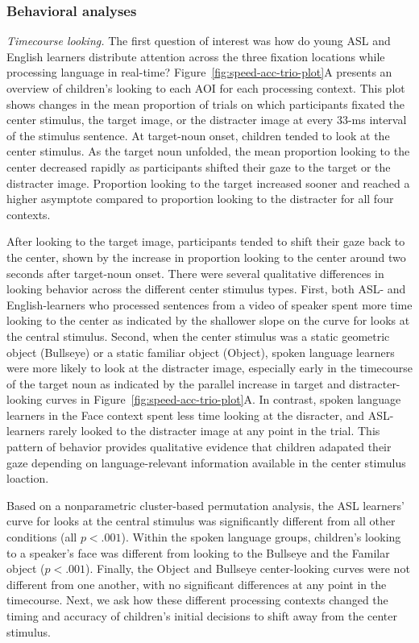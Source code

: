 \documentclass[,man,floatsintext]{apa6}
\begin{document}
\subsubsection{Behavioral analyses}\label{behavioral-analyses}

\emph{Timecourse looking.} The first question of interest was how do
young ASL and English learners distribute attention across the three
fixation locations while processing language in real-time?
Figure~\ref{fig:speed-acc-trio-plot}A presents an overview of children's
looking to each AOI for each processing context. This plot shows changes
in the mean proportion of trials on which participants fixated the
center stimulus, the target image, or the distracter image at every
33-ms interval of the stimulus sentence. At target-noun onset, children
tended to look at the center stimulus. As the target noun unfolded, the
mean proportion looking to the center decreased rapidly as participants
shifted their gaze to the target or the distracter image. Proportion
looking to the target increased sooner and reached a higher asymptote
compared to proportion looking to the distracter for all four contexts.

After looking to the target image, participants tended to shift their
gaze back to the center, shown by the increase in proportion looking to
the center around two seconds after target-noun onset. There were
several qualitative differences in looking behavior across the different
center stimulus types. First, both ASL- and English-learners who
processed sentences from a video of speaker spent more time looking to
the center as indicated by the shallower slope on the curve for looks at
the central stimulus. Second, when the center stimulus was a static
geometric object (Bullseye) or a static familiar object (Object), spoken
language learners were more likely to look at the distracter image,
especially early in the timecourse of the target noun as indicated by
the parallel increase in target and distracter-looking curves in
Figure~\ref{fig:speed-acc-trio-plot}A. In contrast, spoken language
learners in the Face context spent less time looking at the disracter,
and ASL-learners rarely looked to the distracter image at any point in
the trial. This pattern of behavior provides qualitative evidence that
children adapated their gaze depending on language-relevant information
available in the center stimulus loaction.

Based on a nonparametric cluster-based permutation analysis, the ASL
learners' curve for looks at the central stimulus was significantly
different from all other conditions (all \(p < .001\)). Within the
spoken language groups, children's looking to a speaker's face was
different from looking to the Bullseye and the Familar object
(\(p < .001\)). Finally, the Object and Bullseye center-looking curves
were not different from one another, with no significant differences at
any point in the timecourse. Next, we ask how these different processing
contexts changed the timing and accuracy of children's initial decisions
to shift away from the center stimulus.
\end{document}
